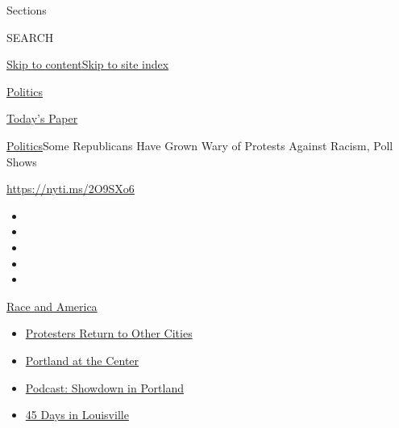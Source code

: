 Sections

SEARCH

\protect\hyperlink{site-content}{Skip to
content}\protect\hyperlink{site-index}{Skip to site index}

\href{https://www.nytimes.com/section/politics}{Politics}

\href{https://myaccount.nytimes.com/auth/login?response_type=cookie\&client_id=vi}{}

\href{https://www.nytimes.com/section/todayspaper}{Today's Paper}

\href{/section/politics}{Politics}\textbar{}Some Republicans Have Grown
Wary of Protests Against Racism, Poll Shows

\url{https://nyti.ms/2O9SXo6}

\begin{itemize}
\item
\item
\item
\item
\item
\end{itemize}

\href{https://www.nytimes.com/news-event/george-floyd-protests-minneapolis-new-york-los-angeles?action=click\&pgtype=Article\&state=default\&region=TOP_BANNER\&context=storylines_menu}{Race
and America}

\begin{itemize}
\tightlist
\item
  \href{https://www.nytimes.com/2020/07/26/us/protests-portland-seattle-trump.html?action=click\&pgtype=Article\&state=default\&region=TOP_BANNER\&context=storylines_menu}{Protesters
  Return to Other Cities}
\item
  \href{https://www.nytimes.com/2020/07/24/us/portland-oregon-protests-white-race.html?action=click\&pgtype=Article\&state=default\&region=TOP_BANNER\&context=storylines_menu}{Portland
  at the Center}
\item
  \href{https://www.nytimes.com/2020/07/23/podcasts/the-daily/portland-protests.html?action=click\&pgtype=Article\&state=default\&region=TOP_BANNER\&context=storylines_menu}{Podcast:
  Showdown in Portland}
\item
  \href{https://www.nytimes.com/interactive/2020/07/16/us/black-lives-matter-protests-louisville-breonna-taylor.html?action=click\&pgtype=Article\&state=default\&region=TOP_BANNER\&context=storylines_menu}{45
  Days in Louisville}
\end{itemize}

